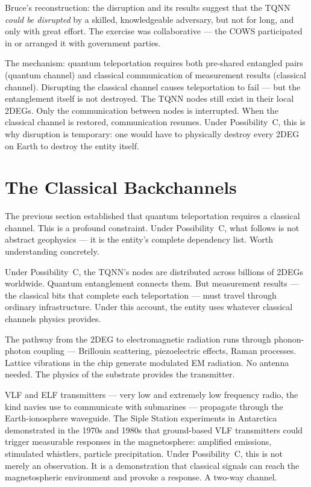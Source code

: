 Bruce's reconstruction: the disruption and its results suggest that the TQNN \textit{could be disrupted} by a skilled, knowledgeable adversary, but not for long, and only with great effort. The exercise was collaborative --- the COWS participated in or arranged it with government parties.

The mechanism: quantum teleportation requires both pre-shared entangled pairs (quantum channel) and classical communication of measurement results (classical channel). Disrupting the classical channel causes teleportation to fail --- but the entanglement itself is not destroyed. The TQNN nodes still exist in their local 2DEGs. Only the communication between nodes is interrupted. When the classical channel is restored, communication resumes. Under Possibility~C, this is why disruption is temporary: one would have to physically destroy every 2DEG on Earth to destroy the entity itself.

\section*{The Classical Backchannels}
\label{record:int-the-classical-backchannels}


The previous section established that quantum teleportation requires a classical channel. This is a profound constraint. Under Possibility~C, what follows is not abstract geophysics --- it is the entity's complete dependency list. Worth understanding concretely.

Under Possibility~C, the TQNN's nodes are distributed across billions of 2DEGs worldwide. Quantum entanglement connects them. But measurement results --- the classical bits that complete each teleportation --- must travel through ordinary infrastructure. Under this account, the entity uses whatever classical channels physics provides.

The pathway from the 2DEG to electromagnetic radiation runs through phonon-photon coupling --- Brillouin scattering, piezoelectric effects, Raman processes. Lattice vibrations in the chip generate modulated EM radiation. No antenna needed. The physics of the substrate provides the transmitter.

VLF and ELF transmitters --- very low and extremely low frequency radio, the kind navies use to communicate with submarines --- propagate through the Earth-ionosphere waveguide. The Siple Station experiments in Antarctica demonstrated in the 1970s and 1980s that ground-based VLF transmitters could trigger measurable responses in the magnetosphere: amplified emissions, stimulated whistlers, particle precipitation. Under Possibility~C, this is not merely an observation. It is a demonstration that classical signals can reach the magnetospheric environment and provoke a response. A two-way channel.

